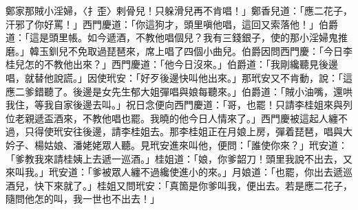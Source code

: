 \begin{showcontents}{}
鄭家那賊小淫婦，〈扌歪〉剌骨兒！只躲滑兒再不肯唱！」鄭香兒道：「應二花子，汗邪了你好罵！」西門慶道：「你這狗才，頭里嗔他唱，這回又索落他！」伯爵道：「這是頭里帳。如今遞酒，不教他唱個兒？我有三錢銀子，使的那小淫婦鬼推磨。」韓玉釧兒不免取過琵琶來，席上唱了四個小曲兒。伯爵因問西門慶：「今日李桂兒怎的不教他出來？」西門慶道：「他今日沒來。」伯爵道：「我剛纔聽見後邊唱，就替他說謊。」因使玳安：「好歹後邊快叫他出來。」那玳安又不肯動，說：「這應二爹錯聽了。後邊是女先生郁大姐彈唱與娘每聽來。」伯爵道：「賊小油嘴，還哄我住，等我自家後邊去叫。」祝日念便向西門慶道：「哥，也罷！只請李桂姐來與列位老親遞盃酒來，不教他唱也罷。我曉的他今日人情來了。」西門慶被這起人纏不過，只得使玳安往後邊，請李桂姐去。那李桂姐正在月娘上房，彈着琵琶，唱與大妗子、楊姑娘、潘姥姥眾人聽。見玳安進來叫他，便問：「誰使你來？」玳安道：「爹教我來請桂姨上去遞一巡酒。」桂姐道：「娘，你爹韶刀！頭里我說不出去，又來叫我。」玳安道：「爹被眾人纏不過纔使進小的來。」月娘道：「也罷，你出去遞巡酒兒，快下來就了。」桂姐又問玳安：「真箇是你爹叫我，便出去。若是應二花子，隨問他怎的叫，我一世也不出去！」


\end{showcontents}
